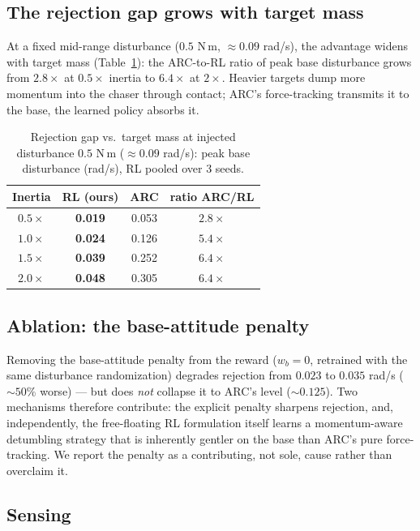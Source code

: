 \documentclass[conference]{IEEEtran}
\begin{document}
\subsection{The rejection gap grows with target mass}

At a fixed mid-range disturbance ($0.5$ N\,m, $\approx 0.09$ rad/s), the advantage widens with target
mass (Table~\ref{tab:gapmass}): the ARC-to-RL ratio of peak base disturbance grows from $2.8\times$ at
$0.5\times$ inertia to $6.4\times$ at $2\times$. Heavier targets dump more momentum into the chaser
through contact; ARC's force-tracking transmits it to the base, the learned policy absorbs it.

\begin{table}[t]
\centering
\caption{Rejection gap vs.\ target mass at injected disturbance $0.5$ N\,m ($\approx 0.09$ rad/s):
peak base disturbance (rad/s), RL pooled over 3 seeds.}
\label{tab:gapmass}
\begin{tabular}{c|ccc}
\hline
Inertia & RL (ours) & ARC & ratio ARC/RL \\
\hline
$0.5\times$ & \textbf{0.019} & 0.053 & $2.8\times$ \\
$1.0\times$ & \textbf{0.024} & 0.126 & $5.4\times$ \\
$1.5\times$ & \textbf{0.039} & 0.252 & $6.4\times$ \\
$2.0\times$ & \textbf{0.048} & 0.305 & $6.4\times$ \\
\hline
\end{tabular}
\end{table}

\subsection{Ablation: the base-attitude penalty}
\label{sec:ablation}

Removing the base-attitude penalty from the reward ($w_b=0$, retrained with the same disturbance
randomization) degrades rejection from $0.023$ to $0.035$ rad/s ($\sim 50\%$ worse) --- but does
\emph{not} collapse it to ARC's level ($\sim 0.125$). Two mechanisms therefore contribute: the
explicit penalty sharpens rejection, and, independently, the free-floating RL formulation itself
learns a momentum-aware detumbling strategy that is inherently gentler on the base than ARC's pure
force-tracking. We report the penalty as a contributing, not sole, cause rather than overclaim it.

\subsection{Sensing}
\end{document}
